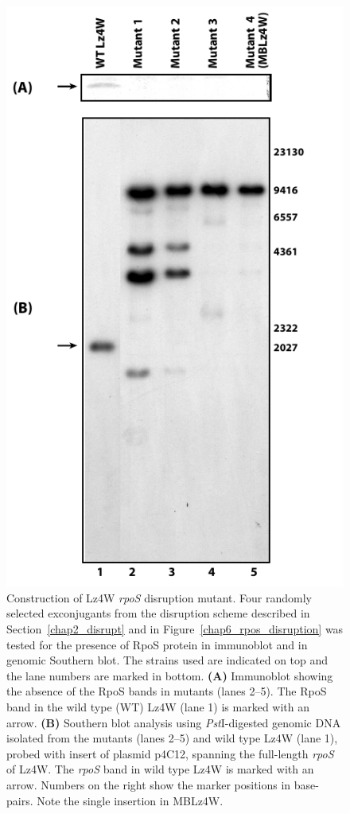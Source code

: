 \begin{figure}[tbp]
\centering
\includegraphics{figures/chap6_mutant_southern}
\caption[Construction of  disruption mutant]{Construction
of Lz4W \emph{rpoS} disruption mutant. Four randomly selected
exconjugants from the disruption scheme described in
Section~\ref{chap2_disrupt} and in
Figure~\ref{chap6_rpos_disruption} was tested for the presence of
RpoS protein in immunoblot and in genomic Southern blot. The
strains used are indicated on top and the lane numbers are marked
in bottom. \textbf{(A)} Immunoblot showing the absence of the RpoS
bands in mutants (lanes 2--5). The RpoS band in the wild type (WT)
Lz4W (lane 1) is marked with an arrow. \textbf{(B)} Southern blot
analysis using \emph{Pst}I-digested genomic DNA isolated from the
mutants (lanes 2--5) and wild type Lz4W (lane 1), probed with
insert of plasmid p4C12, spanning the full-length \emph{rpoS} of
Lz4W. The \emph{rpoS} band in wild type Lz4W is marked with an
arrow. Numbers on the right show the marker positions in
base-pairs. Note the single insertion in MBLz4W.}
\label{chap6:mutant_southern}
\end{figure}

